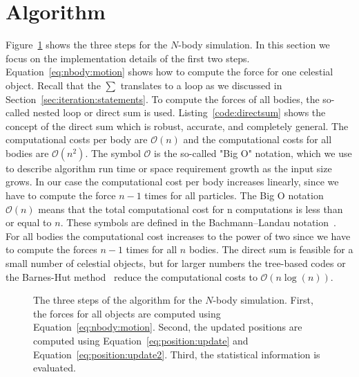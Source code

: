 \section{Algorithm}
Figure~\ref{fig:nbody:algorithm} shows the three steps for the $N$-body simulation. In this section we focus on the implementation details of the first two steps. Equation~\ref{eq:nbody:motion} shows how to compute the force for one celestial object. Recall that the $\sum$ translates to a  loop as we discussed in Section~\ref{sec:iteration:statements}. To compute the forces of all bodies, the so-called nested  loop or direct sum is used. Listing~\ref{code:directsum} shows the concept of the direct sum which is robust, accurate, and completely general. The computational costs per body are $\mathcal{O}(n)$ and the computational costs for all bodies are $\mathcal{O}(n^2)$. The symbol $\mathcal{O}$ is the so-called "Big O" notation, which we use to describe algorithm run time or space requirement growth as the input size grows. In our case the computational cost per body increases linearly, since we have to compute the force $n-1$ times for all particles. The Big O notation $\mathcal{O}(n)$ means that the total computational cost for n computations is less than or equal to $n$. These symbols are defined in the Bachmann–Landau notation~\cite{bachmann1894analytische,landau2000handbuch,knuth1997art}. For all bodies the computational cost increases to the power of two since we have to compute the forces $n-1$ times for all $n$ bodies. The direct sum is feasible for a small number of celestial objects, but for larger numbers the tree-based codes or the Barnes-Hut method~\cite{barnes1986hierarchical} reduce the computational costs to $\mathcal{O}(n\log(n))$. \\

\begin{figure}[tb]
\centering
{}
\caption{The three steps of the algorithm for the $N$-body simulation. First, the forces for all objects are computed using Equation~\ref{eq:nbody:motion}. Second, the updated positions are computed using Equation~\ref{eq:position:update} and Equation~\ref{eq:position:update2}. Third, the statistical information is evaluated.  }
\label{fig:nbody:algorithm}
\end{figure}


